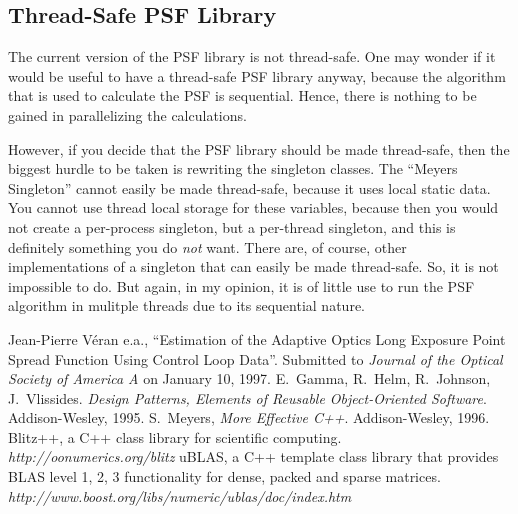 \documentclass[a4paper]{article}
\begin{document}
\subsection{Thread-Safe PSF Library }
\label{subsec:future-threadsafe}
The current version of the PSF library is not thread-safe. One may wonder if
it would be useful to have a thread-safe PSF library anyway, because the
algorithm that is used to calculate the PSF is sequential. Hence, there is
nothing to be gained in parallelizing the calculations. 

However, if you decide that the PSF library should be made thread-safe, then
the biggest hurdle to be taken is rewriting the singleton classes. The
``Meyers Singleton'' cannot easily be made thread-safe, because it uses local
static data. You cannot use thread local storage for these variables, because
then you would not create a per-process singleton, but a per-thread singleton,
and this is definitely something you do {\em not\/} want. There are, of
course, other implementations of a singleton that can easily be made
thread-safe. So, it is not impossible to do. But again, in my opinion, it is
of little use to run the PSF algorithm in mulitple threads due to its
sequential nature.


\begin{thebibliography}{9}
 Jean-Pierre V\'eran e.a., ``Estimation of the Adaptive
Optics Long Exposure Point Spread Function Using Control Loop
Data''. Submitted to {\em Journal of the Optical Society of America A\/} on
January 10, 1997.
 E.\ Gamma, R.\ Helm, R.\ Johnson, J.\ Vlissides. {\em Design
Patterns, Elements of Reusable Object-Oriented Software}. Addison-Wesley,
1995. 
 S.\ Meyers, {\em More Effective C++\/}. Addison-Wesley,
1996. 
 Blitz++, a C++ class library for scientific
computing. {\em http://oonumerics.org/blitz}
 uBLAS, a C++ template class library that provides BLAS level
1, 2, 3 functionality for dense, packed and sparse matrices. {\em
http://www.boost.org/libs/numeric/ublas/doc/index.htm}
\end{thebibliography} 
\end{document}
